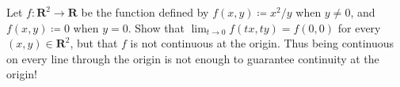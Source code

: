 \begin{exercise}\label{ex 2.2.12}
    Let \(f: \mathbf{R}^2 \to \mathbf{R}\) be the function defined by \(f(x, y) \coloneqq x^2 / y\) when \(y \neq 0\), and \(f(x, y) \coloneqq 0\) when \(y = 0\).
    Show that \(\lim_{t \to 0} f(tx, ty) = f(0, 0)\) for every \((x, y) \in \mathbf{R}^2\), but that \(f\) is not continuous at the origin.
    Thus being continuous on every line through the origin is not enough to guarantee continuity at the origin!
\end{exercise}